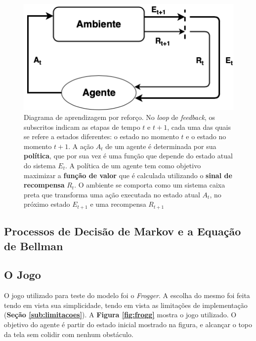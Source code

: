 \begin{figure}[h]
  \centering
  \includegraphics[width=.6 \textwidth]{conteudo/imgs/rl-diagram.png}
  \caption[Diagrama de aprendizagem por reforço]{Diagrama de aprendizagem por reforço. No \textit{loop} de \textit{feedback}, os subscritos indicam as etapas de tempo $t$ e $t + 1$, cada uma das quais se refere a estados diferentes: o estado no momento $t$ e o estado no momento $t + 1$. 
  A ação $A_t$ de um agente é determinada por sua \textbf{política}, que por sua vez é uma função que depende do estado atual do sistema $E_t$. A política de um agente tem como objetivo maximizar a \textbf{função de valor} que é calculada utilizando o \textbf{sinal de recompensa} $R_t$. O ambiente se comporta como um sistema caixa preta que transforma uma ação executada no estado atual $A_t$, no próximo estado $E_{t+1}$ e uma recompensa $R_{t+1}$
  }
  \label{rl-diagram-2}
 \end{figure}

 \subsection{Processos de Decisão de Markov e a Equação de Bellman} %
 \label{sub:processos_de_decisão_de_markov}


 \subsection{O Jogo} %
 \label{sub:o_jogo}

O jogo utilizado para teste do modelo foi o \textit{Frogger}. A escolha do mesmo foi feita tendo em vista sua simplicidade, tendo em vista as limitações de implementação (\textbf{Seção \ref{sub:limitacoes}}). A \textbf{Figura \ref{fig:frogg}} mostra o jogo utilizado. O objetivo do agente é partir do estado inicial mostrado na figura, e alcançar o topo da tela sem colidir com nenhum obstáculo.

